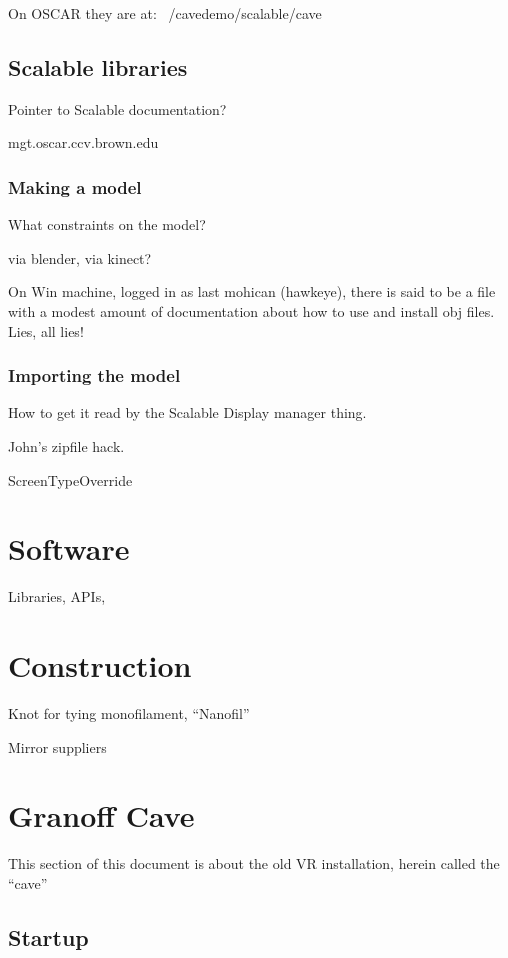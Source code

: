 \documentclass[11pt]{article}
\begin{document}
On OSCAR they are at: ~/cavedemo/scalable/cave


\subsection{Scalable libraries}

Pointer to Scalable documentation?

mgt.oscar.ccv.brown.edu


\subsubsection{Making a model}

What constraints on the model?

via blender, via kinect?

On Win machine, logged in as last mohican (hawkeye), there is said to
be a file with a modest amount of documentation about how to use and
install obj files.  Lies, all lies!


\subsubsection{Importing the model}

How to get it read by the Scalable Display manager thing.

John's zipfile hack.


ScreenTypeOverride


\section{Software}

Libraries, APIs,


\section{Construction}

Knot for tying monofilament, ``Nanofil''

Mirror suppliers



\section{Granoff Cave}

This section of this document is about the old VR installation, herein
called the ``cave''

\subsection{Startup}
\end{document}
